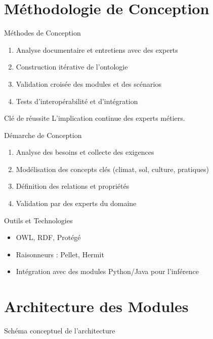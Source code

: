 \documentclass{beamer}
\begin{document}
\section{Méthodologie de Conception}
\begin{frame}{Méthodes de Conception}
  \begin{enumerate}
    \item Analyse documentaire et entretiens avec des experts
    \item Construction itérative de l’ontologie
    \item Validation croisée des modules et des scénarios
    \item Tests d’interopérabilité et d’intégration
  \end{enumerate}
  \pause
  \begin{alertblock}{Clé de réussite}
    L’implication continue des experts métiers.
  \end{alertblock}
\end{frame}
\begin{frame}{Démarche de Conception}
  \begin{enumerate}
    \item Analyse des besoins et collecte des exigences
    \item Modélisation des concepts clés (climat, sol, culture, pratiques)
    \item Définition des relations et propriétés
    \item Validation par des experts du domaine
  \end{enumerate}
\end{frame}

\begin{frame}{Outils et Technologies}
  \begin{itemize}
    \item OWL, RDF, Protégé
    \item Raisonneurs : Pellet, Hermit
    \item Intégration avec des modules Python/Java pour l'inférence
  \end{itemize}
\end{frame}

\section{Architecture des Modules}

\begin{frame}{Schéma conceptuel de l’architecture}
  \centering
\end{frame}
\end{document}
